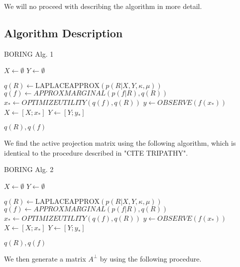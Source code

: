We will no proceed with describing the algorithm in more detail.

\subsection{Algorithm Description}

\begin{algorithm}
\caption{BORING Alg. 1}

\begin{algorithmic} 
\STATE $X \leftarrow \emptyset$
\STATE $Y \leftarrow \emptyset$

\STATE $ q(R) \leftarrow \text{LAPLACEAPPROX}( p(R | X, Y, \kappa, \mu) ) $
\STATE $ q(f) \leftarrow  APPROXMARGINAL( p(f | R), q(R)) $
\STATE $ x_* \leftarrow OPTIMIZEUTILITY( q(f), q(R) )$
\STATE $ y \leftarrow OBSERVE( f( x_* ) ) $
\STATE $ X \leftarrow [X; x_*] $
\STATE $ Y \leftarrow[Y; y_*] $
\ENDWHILE

\RETURN $q(R), q(f)$
\end{algorithmic}

\end{algorithm}

We find the active projection matrix using the following algorithm, which is identical to the procedure described in "CITE TRIPATHY".

\begin{algorithm}
\caption{BORING Alg. 2} 

\begin{algorithmic} 
\STATE $X \leftarrow \emptyset$
\STATE $Y \leftarrow \emptyset$

\STATE $ q(R) \leftarrow \text{LAPLACEAPPROX}( p(R | X, Y, \kappa, \mu) ) $
\STATE $ q(f) \leftarrow  APPROXMARGINAL( p(f | R), q(R)) $
\STATE $ x_* \leftarrow OPTIMIZEUTILITY( q(f), q(R) )$
\STATE $ y \leftarrow OBSERVE( f( x_* ) ) $
\STATE $ X \leftarrow [X; x_*] $
\STATE $ Y \leftarrow[Y; y_*] $
\ENDWHILE

\RETURN $q(R), q(f)$
\end{algorithmic}
\end{algorithm}

We then generate a matrix $ A^{\bot} $ by using the following procedure.

